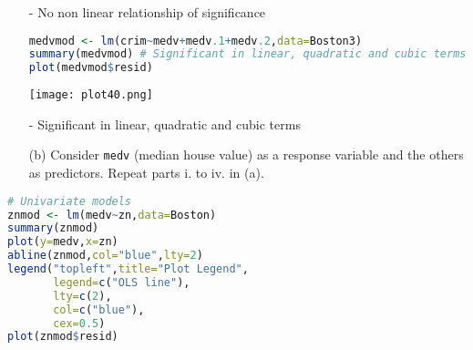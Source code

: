 \documentclass[11pt]{report}
\begin{document}
\begin{itemize}
\item[-] No non linear relationship of significance

\begin{lstlisting}[language=R]
medvmod <- lm(crim~medv+medv.1+medv.2,data=Boston3)
summary(medvmod) # Significant in linear, quadratic and cubic terms
plot(medvmod$resid)
\end{lstlisting}
\texttt{[image: plot40.png]}
\item[-] Significant in linear, quadratic and cubic terms


\item[(b) ] Consider {\tt medv} (median house value) as a response variable and the others as predictors. Repeat parts i. to iv. in (a). \end{itemize}

\begin{lstlisting}[language=R]
# Univariate models
znmod <- lm(medv~zn,data=Boston)
summary(znmod) 
plot(y=medv,x=zn) 
abline(znmod,col="blue",lty=2)
legend("topleft",title="Plot Legend",
       legend=c("OLS line"),
       lty=c(2),
       col=c("blue"),
       cex=0.5)
plot(znmod$resid)   
\end{lstlisting}
\end{document}
